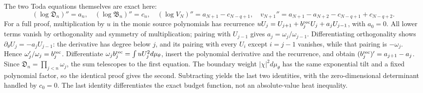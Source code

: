 \documentclass[11pt]{article}
\begin{document}
The two Toda equations themselves are exact here:
\begin{equation}\tag{VH19}\label{VH19}
(\log\mathfrak D_n)''=a_n,\quad
(\log\mathfrak B_n)''=c_n,\quad
(\log V_N)''=a_{N+1}-c_{N-q+1},\quad
v_{N+1}''=a_{N+1}-a_{N+2}-c_{N-q+1}+c_{N-q+2}.
\end{equation}
For a full proof, multiplication by \(u\) in the monic source
polynomials has recurrence
\(uU_j=U_{j+1}+b_j^{\rm rec}U_j+a_jU_{j-1}\), with \(a_0=0\).
All lower terms vanish by orthogonality and symmetry of multiplication;
pairing with \(U_{j-1}\) gives \(a_j=\omega_j/\omega_{j-1}\).
Differentiating orthogonality shows
\(\partial_\theta U_j=-a_jU_{j-1}\): the derivative has degree below
\(j\), and its pairing with every \(U_i\) except \(i=j-1\) vanishes,
while that pairing is \(-\omega_j\). Hence
\(\omega_j'/\omega_j=b_j^{\rm rec}\).
Differentiate \(\omega_j b_j^{\rm rec}=\int uU_j^2d\mu_\theta\),
insert the polynomial derivative and the recurrence, and obtain
\((b_j^{\rm rec})'=a_{j+1}-a_j\).
Since \(\mathfrak D_n=\prod_{j<n}\omega_j\), the sum telescopes to
the first equation. The boundary weight \(|\chi|^2d\mu_\theta\)
has the same exponential tilt and a fixed polynomial factor, so the
identical proof gives the second. Subtracting yields the last two
identities, with the zero-dimensional determinant handled by \(c_0=0\).
The last identity differentiates the exact budget function, not an
absolute-value heat inequality.
\end{document}
